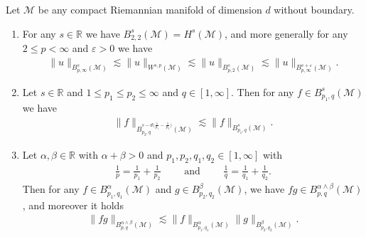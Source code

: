 \documentclass[10pt]{amsart}
\theoremstyle{definition}\newtheorem{defi}[theo]{Definition}\newtheorem{rema}[theo]{Remark}\newtheorem{exam}[theo]{Example}\newtheorem{exem}[theo]{Example}\newtheorem{nota}[theo]{Notation}
\newcommand{\R}{\mathbb{R}}
\newcommand{\M}{\mathcal{M}}
\newcommand{\eps}{\varepsilon}
\newcommand{\les}{\lesssim}
\newcommand*{\romanenumi}{\renewcommand*{\theenumi}{\roman{enumi}}}
\begin{document}
\begin{coro}\label{cor-besov}
Let $\M$ be any compact Riemannian manifold of dimension $d$ without boundary.
\begin{enumerate}\romanenumi
\item\label{coro2.7.i} For any $s\in\R$ we have $B^s_{2,2}(\M)=H^s(\M)$, and more generally for any $2\le p <\infty$ and $\eps>0$ we have
\begin{align*}
\|u\|_{B^s_{p,\infty}(\M)}\les \|u\|_{W^{s,p}(\M)}\les \|u\|_{B^s_{p,2}(\M)} \les \|u\|_{B^{s+\eps}_{p,\infty}(\M)}.
\end{align*}
\item\label{coro2.7.ii} Let $s\in\R$ and $1\leq p_1\leq p_2\leq \infty$ and $q\in [1,\infty]$. Then for any $f\in B^s_{p_1,q}(\M)$ we have
\begin{align*}
\|f\|_{B^{s-d\big(\frac1{p_1}-\frac1{p_2}\big)}_{p_2,q}(\M)}\les \|f\|_{B^s_{p_1,q}(\M)}.
\end{align*}
\item\label{coro2.7.iii} Let $\alpha,\beta\in \R$ with $\alpha+\beta>0$ and $p_1,p_2,q_1,q_2\in [1,\infty]$ with
\begin{align*}
\frac1p = \frac1{p_1}+\frac1{p_2} \qquad\text{ and }\qquad \frac1q=\frac1{q_1}+\frac1{q_2}.
\end{align*}
Then for any $f\in B^{\alpha}_{p_1,q_1}(\M)$ and $g\in B^{\beta}_{p_2,q_2}(\M)$, we have $fg \in B^{\alpha\wedge \beta}_{p,q}(\M)$, and moreover it holds
\begin{align*}
\|fg\|_{B^{\alpha\wedge\beta}_{p,q}(\M)}\les \|f\|_{B^{\alpha}_{p_1,q_1}(\M)}\|g\|_{B^{\beta}_{p_2,q_2}(\M)}.
\end{align*}
\end{enumerate}
\end{coro}
\end{document}
